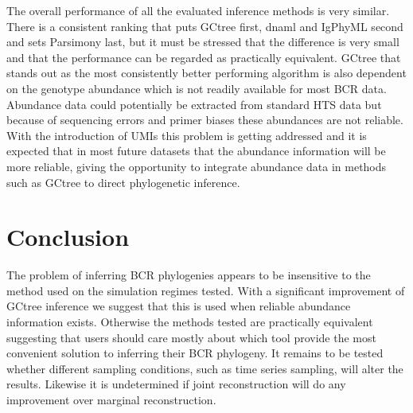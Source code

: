 The overall performance of all the evaluated inference methods is very similar.
There is a consistent ranking that puts GCtree first, dnaml and IgPhyML second and sets Parsimony last, but it must be stressed that the difference is very small and that the performance can be regarded as practically equivalent.
GCtree that stands out as the most consistently better performing algorithm is also dependent on the genotype abundance which is not readily available for most BCR data.
Abundance data could potentially be extracted from standard HTS data but because of sequencing errors and primer biases these abundances are not reliable.
With the introduction of UMIs this problem is getting addressed and it is expected that in most future datasets that the abundance information will be more reliable, giving the opportunity to integrate abundance data in methods such as GCtree to direct phylogenetic inference.




\section{Conclusion}
The problem of inferring BCR phylogenies appears to be insensitive to the method used on the simulation regimes tested.
With a significant improvement of GCtree inference we suggest that this is used when reliable abundance information exists.
Otherwise the methods tested are practically equivalent suggesting that users should care mostly about which tool provide the most convenient solution to inferring their BCR phylogeny.
It remains to be tested whether different sampling conditions, such as time series sampling, will alter the results.
Likewise it is undetermined if joint reconstruction will do any improvement over marginal reconstruction.


